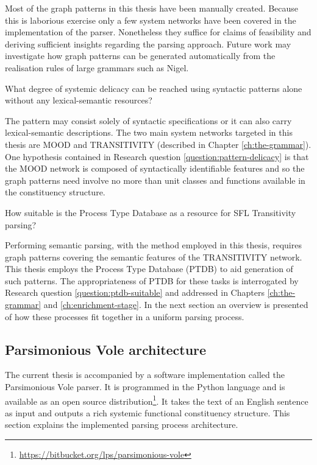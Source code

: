    Most of the graph patterns in this thesis have been manually created. Because this is laborious exercise only a few system networks have been covered in the implementation of the parser. Nonetheless they suffice for claims of feasibility and deriving sufficient insights regarding the parsing approach. Future work may investigate how graph patterns can be generated automatically from the realisation rules of large grammars such as Nigel. 

    \begin{question}\label{question:pattern-delicacy}
        What degree of systemic delicacy can be reached using syntactic patterns alone without any lexical-semantic resources?
    \end{question}

    The pattern may consist solely of syntactic specifications or it can also carry lexical-semantic descriptions. 
    The two main system networks targeted in this thesis are MOOD and TRANSITIVITY (described in Chapter \ref{ch:the-grammar}). One hypothesis contained in Research question \ref{question:pattern-delicacy} is that the MOOD network is composed of syntactically identifiable features and so the graph patterns need involve no more than unit classes and functions available in the constituency structure. 

    \begin{question}\label{question:ptdb-suitable}
        How suitable is the Process Type Database as a resource for SFL Transitivity parsing? 
    \end{question}

    Performing semantic parsing, with the method employed in this thesis, requires graph patterns covering the semantic features of the TRANSITIVITY network. This thesis employs the Process Type Database (PTDB) \citep{Neale2002} to aid generation of such patterns. The appropriateness of PTDB for these tasks is interrogated by Research question \ref{question:ptdb-suitable} and addressed in Chapters \ref{ch:the-grammar} and \ref{ch:enrichment-stage}. In the next section an overview is presented of how these processes fit together in a uniform parsing process.

\subsection{Parsimonious Vole architecture}
\label{sec:architecture}
    The current thesis is accompanied by a software implementation called the Parsimonious Vole parser. It is programmed in the Python language and is available as an open source distribution\footnote{\url{https://bitbucket.org/lps/parsimonious-vole}}. It takes the text of an English sentence as input and outputs a rich systemic functional constituency structure. This section explains the implemented parsing process architecture.
    
